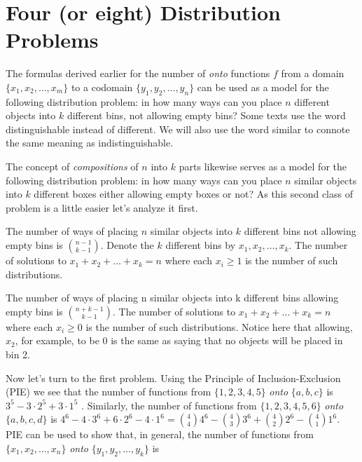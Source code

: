 \documentclass[10pt,]{book}
\theoremstyle{plain}
\theoremstyle{definition}
\theoremstyle{definition}
\numberwithin{equation}{chapter}
\begin{document}
\chapter[{Four (or eight) Distribution Problems}]{Four (or eight) Distribution Problems}\label{ch_temp}
\hypertarget{p-262}{}%
The formulas derived earlier for the number of \emph{onto} functions \(f\) from a domain \(\{x_{1},x_{2},\ldots,x_{m}\}\) to a codomain \(\{ y_{1},y_{2},\ldots,y_{n}\}\) can be used as a model for the following distribution problem: in how many ways can you place \(n\) different objects into \(k\) different bins, not allowing empty bins? Some texts use the word distinguishable instead of different. We will also use the word similar to connote the same meaning as indistinguishable.%
\par
\hypertarget{p-263}{}%
The concept of \emph{compositions} of \(n\) into \(k\) parts likewise serves as a model for the following distribution problem: in how many ways can you place \(n\) similar objects into \(k\) different boxes either allowing empty boxes or not? As this second class of problem is a little easier let's analyze it first.%
\begin{assemblage}\label{assemblage-2}
\hypertarget{p-264}{}%
The number of ways of placing \(n\) similar objects into \(k\) different bins not allowing empty bins is \(\binom{n - 1}{k - 1}\). Denote the \(k\) different bins by \(x_{1},x_{2},\ldots,x_{k}\). The number of solutions to \(x_{1} + x_{2} + \ldots + x_{k} = n\) where each \(x_{i} \geq 1\) is the number of such distributions.%
\end{assemblage}
\begin{assemblage}\label{assemblage-3}
\hypertarget{p-265}{}%
The number of ways of placing n similar objects into k different bins allowing empty bins is \(\binom{n + k - 1}{k - 1}\). The number of solutions to \(x_{1} + x_{2} + \ldots + x_{k} = n\) where each \(x_{i} \geq 0\) is the number of such distributions. Notice here that allowing, \(x_{2}\), for example, to be 0 is the same as saying that no objects will be placed in bin 2.%
\end{assemblage}
\hypertarget{p-266}{}%
Now let's turn to the first problem. Using the Principle of Inclusion-Exclusion (PIE) we see that the number of functions from \(\{1, 2, 3, 4, 5\}\) \emph{onto} \(\{a, b, c\}\) is \(3^{5} - 3 \cdot 2^{5} + 3 \cdot 1^5\) . Similarly, the number of functions from \(\{1, 2, 3, 4, 5, 6\}\) \emph{onto} \(\{a, b, c, d\}\) is \(4^{6} - 4 \cdot 3^{6} + 6 \cdot 2^{6} - 4 \cdot 1^{6} = \binom{4}{4} 4^{6} - \binom{4}{3} 3^{6} + \binom{4}{2} 2^{6} - \binom{4}{1} 1^{6}\). PIE can be used to show that, in general, the number of functions from \(\{ x_{1},x_{2},\ldots,x_{n}\}\) \emph{onto} \(\{ y_{1},y_{2},\ldots,y_{k}\}\) is%
\end{document}
